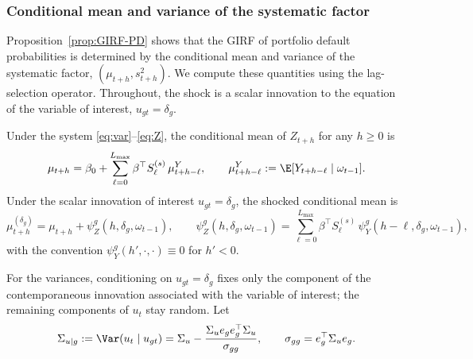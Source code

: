 \subsubsection{Conditional mean and variance of the systematic factor}
\label{subsec:mu-s2}
Proposition~\ref{prop:GIRF-PD} shows that the GIRF of portfolio default
probabilities is determined by the conditional mean and variance of the
systematic factor, $(\mu_{t+h}, s_{t+h}^2)$. We compute these quantities using
the lag-selection operator. Throughout, the shock is a scalar innovation to the
equation of the variable of interest, $u_{gt}=\delta_g$.
\begin{prop}
\label{prop:Mean}
    Under the system \eqref{eq:var}--\eqref{eq:Z}, the conditional mean of
    $Z_{t+h}$ for any $h\ge 0$ is
    \begin{equation}
    \label{eq:mu-baseline}
        \mu_{t+h}
        =
        \beta_0
        +
        \sum_{\ell=0}^{L_{\max}}
            \beta^\top S^{(s)}_\ell \,\mu^Y_{t+h-\ell},
        \qquad
        \mu^Y_{t+h-\ell}:=\E[Y_{t+h-\ell}\mid\omega_{t-1}].
    \end{equation}
    Under the scalar innovation of interest $u_{gt}=\delta_g$, the shocked
    conditional mean is
    \begin{equation}
        \label{eq:mu-shocked}
        \mu^{(\delta_g)}_{t+h}
        =
        \mu_{t+h}
        +
        \psi_Z^g(h,\delta_g,\omega_{t-1}),
        \qquad
        \psi_Z^g(h,\delta_g,\omega_{t-1})
        =
        \sum_{\ell=0}^{L_{\max}}
            \beta^\top S^{(s)}_\ell\,
            \psi_Y^g(h-\ell,\delta_g,\omega_{t-1}),
    \end{equation}
    with the convention $\psi_Y^g(h',\cdot,\cdot)\equiv 0$ for $h'<0$.
\end{prop}
For the variances, conditioning on $u_{gt}=\delta_g$ fixes only the component of
the contemporaneous innovation associated with the variable of interest; the
remaining components of $u_t$ stay random. Let
\begin{equation}
    \label{eq:sigma-u-cond-g}
    \Sigma_{u\mid g}
    :=
    \Var(u_t\mid u_{gt})
    =
    \Sigma_u
    -
    \frac{\Sigma_u e_g e_g^\top \Sigma_u}{\sigma_{gg}},
    \qquad
    \sigma_{gg}=e_g^\top\Sigma_u e_g.
\end{equation}
